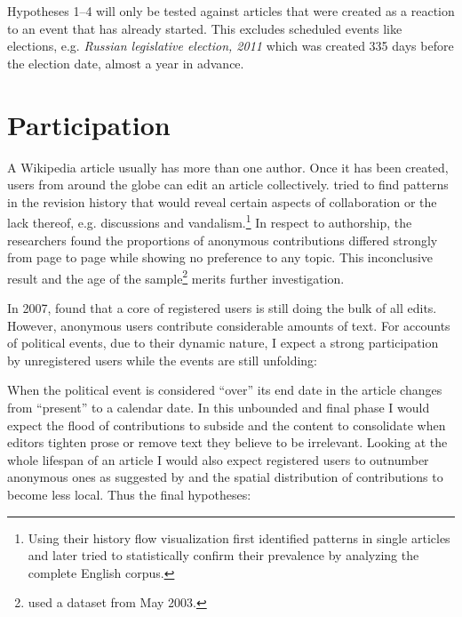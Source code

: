 
Hypotheses 1--4 will only be tested against articles that were created as a reaction to an event that has already started. 
This excludes scheduled events like elections, e.g. \emph{Russian legislative election, 2011} which was created 335 days before the election date, almost a year in advance.


\section{Participation}\label{sec:participation}

A Wikipedia article usually has more than one author.
Once it has been created, users from around the globe can edit an article collectively.
\textcite{viegas2004history} tried to find patterns in the revision history that would reveal certain aspects of collaboration or the lack thereof, e.g. discussions and vandalism.\footnote{Using their history flow visualization \textcite{viegas2004history} first identified patterns in single articles and later tried to statistically confirm their prevalence by analyzing the complete English corpus.} 
In respect to authorship, the researchers found the proportions of anonymous contributions differed strongly from page to page while showing no preference to any topic.
This inconclusive result and the age of the sample\footnote{\textcite{viegas2004history} used a dataset from May 2003.} merits further investigation. 

In 2007, \textcite{kittur2007power} found that a core of registered users is still doing the bulk of all edits.
However, anonymous users contribute considerable amounts of text. 
For accounts of political events, due to their dynamic nature, I expect a strong participation by unregistered users while the events are still unfolding:



When the political event is considered ``over'' its end date in the article changes from ``present'' to a calendar date.
In this unbounded and final phase I would expect the flood of contributions to subside and the content to consolidate when editors tighten prose or remove text they believe to be irrelevant.
Looking at the whole lifespan of an article I would also expect registered users to outnumber anonymous ones as suggested by \textcite{kittur2007power} and the spatial distribution of contributions to become less local.
Thus the final hypotheses:

